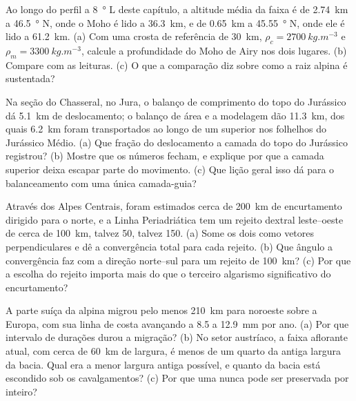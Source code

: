 \begin{exercise}[$\star\star$]\label{exo:b2:alpine-orogen:9}
Ao longo do perfil a \qty{8}{\degree} L deste capítulo, a altitude média da faixa é de
\qty{2.74}{km} a \qty{46.5}{\degree} N, onde o Moho é lido a \qty{36.3}{km}, e de
\qty{0.65}{km} a \qty{45.55}{\degree} N, onde ele é lido a \qty{61.2}{km}. (a) Com uma
crosta de referência de \qty{30}{km}, $\rho_c = \qty{2700}{kg.m^{-3}}$ e $\rho_m =
\qty{3300}{kg.m^{-3}}$, calcule a profundidade do Moho de Airy nos dois lugares. (b) Compare com as
leituras. (c) O que a comparação diz sobre como a raiz alpina é sustentada?
\end{exercise}

\begin{exercise}[$\star\star\star$]\label{exo:b2:alpine-orogen:10}
Na seção do Chasseral, no Jura, o balanço de comprimento do topo do Jurássico
dá \qty{5.1}{km} de deslocamento; o balanço de área e a modelagem dão \qty{11.3}{km}, dos
quais \qty{6.2}{km} foram transportados ao longo de um  superior nos folhelhos do Jurássico Médio.
(a) Que fração do deslocamento a camada do topo do Jurássico registrou? (b) Mostre que os
números fecham, e explique por que a camada superior deixa escapar parte do movimento. (c) Que
lição geral isso dá para o balanceamento com uma única camada-guia?
\end{exercise}

\begin{exercise}[$\star\star\star$]\label{exo:b2:alpine-orogen:11}
Através dos Alpes Centrais, foram estimados cerca de \qty{200}{km} de encurtamento dirigido para o norte,
e a Linha Periadriática tem um rejeito dextral leste--oeste de cerca de
\qty{100}{km}, talvez 50, talvez 150. (a) Some os dois como vetores perpendiculares e dê
a convergência total para cada rejeito. (b) Que ângulo a convergência faz com a
direção norte--sul para um rejeito de \qty{100}{km}? (c) Por que a escolha do rejeito
importa mais do que o terceiro algarismo significativo do encurtamento?
\end{exercise}

\begin{exercise}[$\star\star\star$]\label{exo:b2:alpine-orogen:12}
A parte suíça da  alpina migrou pelo menos \qty{210}{km} para noroeste
sobre a Europa, com sua linha de costa avançando a 8.5 a \qty{12.9}{mm} por ano. (a) Por que intervalo de
durações durou a migração? (b) No setor austríaco, a faixa aflorante atual,
com cerca de \qty{60}{km} de largura, é menos de um quarto da antiga largura da bacia. Qual era a
menor largura antiga possível, e quanto da bacia está escondido sob os cavalgamentos? (c) Por que uma
 nunca pode ser preservada por inteiro?
\end{exercise}

